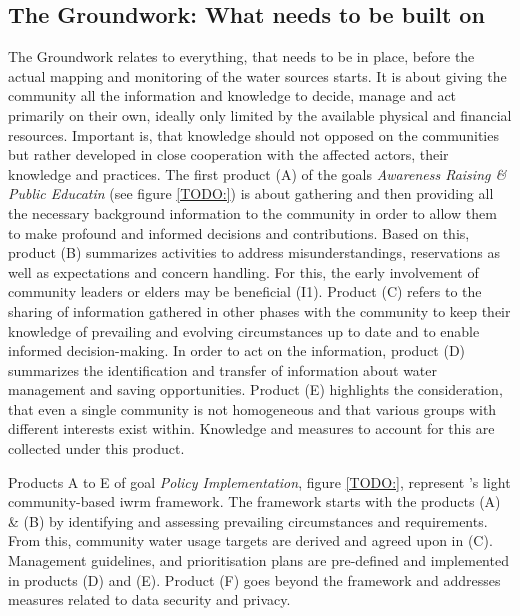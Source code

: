 
\subsection{The Groundwork: What needs to be built on}\label{subsubsec:groundwork}
The Groundwork relates to everything, that needs to be in place, before the actual mapping and monitoring of the water sources starts. It is about giving the community all the information and knowledge to decide, manage and act primarily on their own, ideally only limited by the available physical and financial resources. Important is, that knowledge should not opposed on the communities but rather developed in close cooperation with the affected actors, their knowledge and practices. The first product (A) of the goals \textit{Awareness Raising \& Public Educatin} (see figure \ref{TODO:}) is about gathering and then providing all the necessary background information to the community in order to allow them to make profound and informed decisions and contributions. Based on this, product (B) summarizes activities to address misunderstandings, reservations as well as expectations and concern handling. For this, the early involvement of community leaders or elders may be beneficial (I1). Product (C) refers to the sharing of information gathered in other phases with the community to keep their knowledge of prevailing and evolving circumstances up to date and to enable informed decision-making. In order to act on the information, product (D) summarizes the identification and transfer of information about water management and saving opportunities. Product (E) highlights the consideration, that even a single community is not homogeneous and that various groups with different interests exist within. Knowledge and measures to account for this are collected under this product.\newline


Products A to E of goal \textit{Policy Implementation}, figure \ref*{TODO:}, represent \autocite{dayCommunitybasedWaterResources2009}'s light community-based \acrshort{iwrm} framework. The framework starts with the products (A) \& (B) by identifying and assessing prevailing circumstances and requirements. From this, community water usage targets are derived and agreed upon in (C). Management guidelines, and prioritisation plans are pre-defined and implemented in products (D) and (E). Product (F) goes beyond the framework and addresses measures related to data security and privacy.


